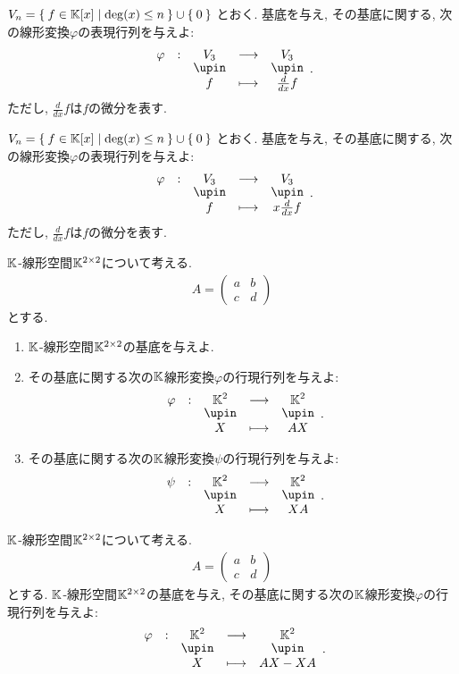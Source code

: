 \begin{quiz}
  $V_n=\Set{f\in \mathbb{K}[x] |\deg(x) \leq n}\cup\Set{0}$
  とおく.
  基底を与え,
  その基底に関する,
  次の線形変換$\varphi$の表現行列を与えよ:
  \begin{align*}
    \shazo{\varphi}{V_3}{V_3}
    {f}{\frac{d}{dx}f}.
  \end{align*}
  ただし, $\frac{d}{dx}f$は$f$の微分を表す.
\end{quiz}

\begin{quiz}
  $V_n=\Set{f\in \mathbb{K}[x] |\deg(x) \leq n}\cup\Set{0}$
  とおく.
  基底を与え,
  その基底に関する,
  次の線形変換$\varphi$の表現行列を与えよ:
  \begin{align*}
    \shazo{\varphi}{V_3}{V_3}
    {f}{x\frac{d}{dx}f}.
  \end{align*}
  ただし, $\frac{d}{dx}f$は$f$の微分を表す.
\end{quiz}




\begin{quiz}
  $\mathbb{K}$-線形空間$\mathbb{K}^{2\times 2}$について考える.
  \begin{align*}
    A=\begin{pmatrix} a&b\\c&d\end{pmatrix}
  \end{align*}
  とする.
  \begin{enumerate}
  \item
    $\mathbb{K}$-線形空間$\mathbb{K}^{2\times 2}$の基底を与えよ.
  \item
  その基底に関する次の$\mathbb{K}$線形変換$\varphi$の行現行列を与えよ:
  \begin{align*}
    \shazo{\varphi}{\KK^2}{\KK^2}
    {X}{AX}.
  \end{align*}
  \item
  その基底に関する次の$\mathbb{K}$線形変換$\psi$の行現行列を与えよ:
  \begin{align*}
    \shazo{\psi}{\KK^2}{\KK^2}
    {X}{XA}.
  \end{align*}
  \end{enumerate}
\end{quiz}

\begin{quiz}
  $\mathbb{K}$-線形空間$\mathbb{K}^{2\times 2}$について考える.
  \begin{align*}
    A=\begin{pmatrix} a&b\\c&d\end{pmatrix}
  \end{align*}
  とする.
    $\mathbb{K}$-線形空間$\mathbb{K}^{2\times 2}$の基底を与え,
  その基底に関する次の$\mathbb{K}$線形変換$\varphi$の行現行列を与えよ:
  \begin{align*}
    \shazo{\varphi}{\KK^2}{\KK^2}
    {X}{AX-XA}.
  \end{align*}
\end{quiz}

